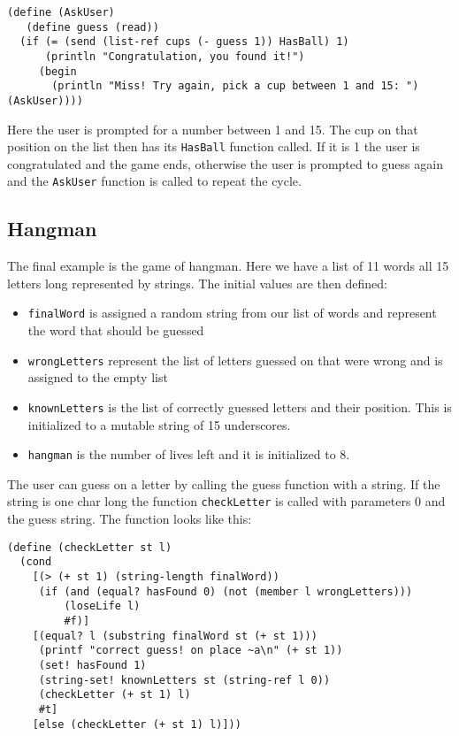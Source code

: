 \begin{lstlisting}[caption={The AskUser function in DrRacket}, label={DrRacket_AskUser}]
(define (AskUser)
   (define guess (read))
  (if (= (send (list-ref cups (- guess 1)) HasBall) 1)
      (println "Congratulation, you found it!")
     (begin
       (println "Miss! Try again, pick a cup between 1 and 15: ") (AskUser))))
\end{lstlisting}

Here the user is prompted for a number between 1 and 15.
The cup on that position on the list then has its \lstinline!HasBall! function called.
If it is 1 the user is congratulated and the game ends, otherwise the user is prompted to guess again and the \lstinline!AskUser! function is called to repeat the cycle.

\subsection{Hangman}
The final example is the game of hangman.
Here we have a list of 11 words all 15 letters long represented by strings. The initial values are then defined:
\begin{itemize}
\item \lstinline!finalWord! is assigned a random string from our list of words and represent the word that should be guessed
\item \lstinline!wrongLetters! represent the list of letters guessed on that were wrong and is assigned to the empty list
\item \lstinline!knownLetters! is the list of correctly guessed letters and their position. This is initialized to a mutable string of 15 underscores.
\item \lstinline!hangman! is the number of lives left and it is initialized to 8.
\end{itemize}

The user can guess on a letter by calling the guess function with a string.
If the string is one char long the function \lstinline!checkLetter! is called with parameters 0 and the guess string. The function looks like this:

\begin{lstlisting}[caption={The checkLetter function in DrRacket}, label={DrRacket_checkLetter}]
(define (checkLetter st l)
  (cond
    [(> (+ st 1) (string-length finalWord))
     (if (and (equal? hasFound 0) (not (member l wrongLetters)))
         (loseLife l)
         #f)]
    [(equal? l (substring finalWord st (+ st 1)))
     (printf "correct guess! on place ~a\n" (+ st 1))
     (set! hasFound 1)
     (string-set! knownLetters st (string-ref l 0))
     (checkLetter (+ st 1) l)
     #t]
    [else (checkLetter (+ st 1) l)]))
\end{lstlisting}

